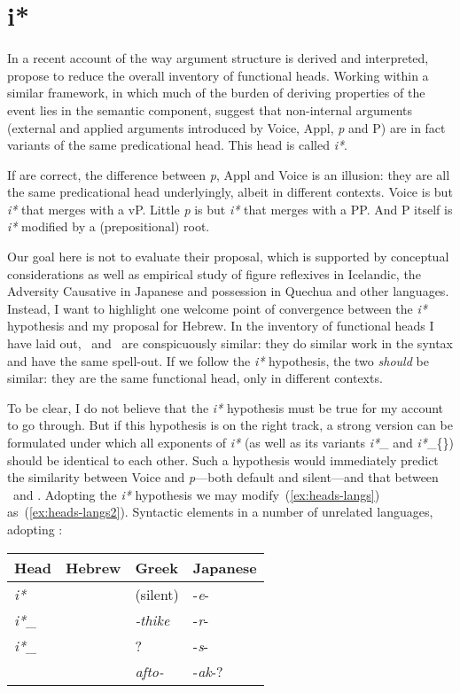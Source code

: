 \section{i*}
In a recent account of the way argument structure is derived and interpreted, \cite{woodmarantz15} propose to reduce the overall inventory of functional heads. Working within a similar framework, in which much of the burden of deriving properties of the event lies in the semantic component, \citeauthor{woodmarantz15} suggest that non-internal arguments (external and applied arguments introduced by Voice, Appl, \emph{p} and P) are in fact variants of the same predicational head. This head is called \emph{i*}.

If \cite{woodmarantz15} are correct, the difference between \emph{p}, Appl and Voice is an illusion: they are all the same predicational head underlyingly, albeit in different contexts. Voice is but \emph{i*} that merges with a vP. Little \emph{p} is but \emph{i*} that merges with a PP. And P itself is \emph{i*} modified by a (prepositional) root.

Our goal here is not to evaluate their proposal, which is supported by conceptual considerations as well as empirical study of figure reflexives in Icelandic, the Adversity Causative in Japanese and possession in Quechua and other languages. Instead, I want to highlight one welcome point of convergence between the \emph{i*} hypothesis and my proposal for Hebrew. In the inventory of functional heads I have laid out, \vz~and \pz~are conspicuously similar: they do similar work in the syntax and have the same spell-out. If we follow the \emph{i*} hypothesis, the two \emph{should} be similar: they are the same functional head, only in different contexts.

To be clear, I do not believe that the \emph{i*} hypothesis must be true for my account to go through. But if this hypothesis is on the right track, a strong version can be formulated under which all exponents of \emph{i*} (as well as its variants \emph{i*}_{\text{\zero}} and \emph{i*}_{\{\}}) should be identical to each other. Such a hypothesis would immediately predict the similarity between Voice and \emph{p}---both default and silent---and that between \vz~and \pz. {Adopting the \emph{i*} hypothesis we may modify~(\ref{ex:heads-langs}) as~(\ref{ex:heads-langs2}).}
\ex\label{ex:heads-langs2}Syntactic elements in a number of unrelated languages, adopting \cite{woodmarantz15}:\\
	\begin{tabular}{l|lll}
	Head 		& Hebrew 		& Greek  		& Japanese\\\hline
	\emph{i*}   	& \tkal     & (silent)      & -\emph{e}-\\
	\emph{i*}_{\text{\zero}} 	& \tnif 	& \emph{-thike}	& -\emph{r}-\\
	\emph{i*}_{\text{\{D\}}}	& \thif		& ?		& -\emph{s}-\\
	{\va}	& \tpie		& \emph{afto-}	& -\emph{ak}-?\\
	\end{tabular}
\xe

